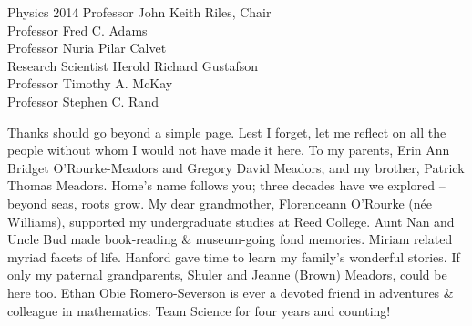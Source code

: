 \documentclass[leqno,twoside]{report}
\theoremstyle{plain}
\theoremstyle{definition}
\theoremstyle{remark}
\numberwithin{theorem}{chapter}        %
\begin{document}





{Physics} {2014}
{ Professor John Keith Riles, Chair \\
  Professor Fred C. Adams\\
  Professor Nuria Pilar Calvet\\
  Research Scientist Herold Richard Gustafson\\
  Professor Timothy A. McKay\\
  Professor Stephen C. Rand
 }



\initializefrontsections

{}

\setcounter{page}{1}


\startacknowledgementspage


Thanks should go beyond a simple page. 
Lest I forget, let me reflect on all the people without whom I would not have made it here. 
To my parents, Erin Ann Bridget O'Rourke-Meadors and Gregory David Meadors, and my brother, Patrick Thomas Meadors. 
Home's name follows you; three decades have we explored -- beyond seas, roots grow.
My dear grandmother, Florenceann O'Rourke (n\'{e}e Williams), supported my undergraduate studies at Reed College.
Aunt Nan and Uncle Bud made book-reading \& museum-going fond memories.
Miriam related myriad facets of life.
Hanford gave time to learn my family's wonderful stories.
If only my paternal grandparents, Shuler and Jeanne (Brown) Meadors, could be here too.
Ethan Obie Romero-Severson is ever a devoted friend in adventures \& colleague in mathematics: Team Science for four years and counting!
\end{document}
